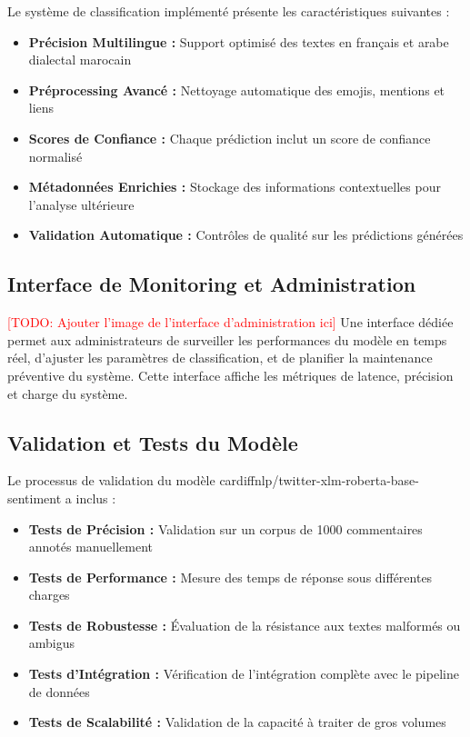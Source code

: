 Le système de classification implémenté présente les caractéristiques suivantes :

\begin{itemize}
    \item \textbf{Précision Multilingue :} Support optimisé des textes en français et arabe dialectal marocain
    \item \textbf{Préprocessing Avancé :} Nettoyage automatique des emojis, mentions et liens
    \item \textbf{Scores de Confiance :} Chaque prédiction inclut un score de confiance normalisé
    \item \textbf{Métadonnées Enrichies :} Stockage des informations contextuelles pour l'analyse ultérieure
    \item \textbf{Validation Automatique :} Contrôles de qualité sur les prédictions générées
\end{itemize}

\subsection{Interface de Monitoring et Administration}

\textcolor{red}{[TODO: Ajouter l'image de l'interface d'administration ici]}
Une interface dédiée permet aux administrateurs de surveiller les performances du modèle en temps réel, d'ajuster les paramètres de classification, et de planifier la maintenance préventive du système. Cette interface affiche les métriques de latence, précision et charge du système.

\subsection{Validation et Tests du Modèle}

Le processus de validation du modèle cardiffnlp/twitter-xlm-roberta-base-sentiment a inclus :

\begin{itemize}
    \item \textbf{Tests de Précision :} Validation sur un corpus de 1000 commentaires annotés manuellement
    \item \textbf{Tests de Performance :} Mesure des temps de réponse sous différentes charges
    \item \textbf{Tests de Robustesse :} Évaluation de la résistance aux textes malformés ou ambigus
    \item \textbf{Tests d'Intégration :} Vérification de l'intégration complète avec le pipeline de données
    \item \textbf{Tests de Scalabilité :} Validation de la capacité à traiter de gros volumes
\end{itemize}


